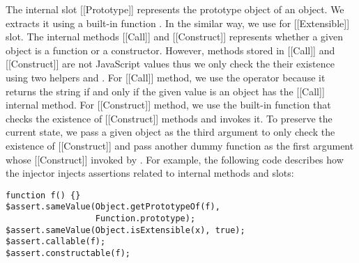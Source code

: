 The internal slot [[Prototype]] represents the prototype object of an object.
We extracts it using a built-in function .  In the
similar way, we use  for [[Extensible]] slot.  The
internal methods [[Call]] and [[Construct]] represents whether a given object is
a function or a constructor.  However, methods stored in [[Call]] and
[[Construct]] are not JavaScript values thus we only check the their existence
using two helpers  and .  For
[[Call]] method, we use the  operator because it returns the string
 if and only if the given value is an object has the [[Call]]
internal method.  For [[Construct]] method, we use the 
built-in function that checks the existence of [[Construct]] methods and invokes
it.  To preserve the current state, we pass a given object as the third argument
to only check the existence of [[Construct]] and pass another dummy function
 as the first argument whose [[Construct]]
invoked by .  For example, the following code describes
how the injector injects assertions related to internal methods and slots:
\begin{lstlisting}[style=myJSstyle]
function f() {}
$assert.sameValue(Object.getPrototypeOf(f),
                  Function.prototype);
$assert.sameValue(Object.isExtensible(x), true);
$assert.callable(f);
$assert.constructable(f);
\end{lstlisting}
